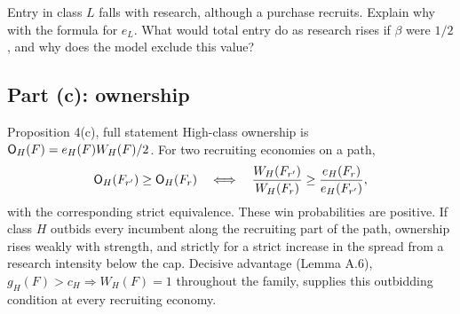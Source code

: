 \begin{checkyourself}\label{q:research-entry}
Entry in class \(L\) falls with research, although a purchase recruits. Explain why with the formula for \(e_L\). What
would total entry do as research rises if \(\beta\) were \(1/2\), and why does the model exclude this value?
\end{checkyourself}

\subsection{Part (c): ownership}

\begin{paperresult}{Proposition 4(c), full statement}
High-class ownership is \(\mathsf{O}_H(F)=e_H(F)W_H(F)/2\). For two recruiting economies on a path,
\[
\mathsf{O}_H(F_{r'})\ge\mathsf{O}_H(F_r)\quad\Longleftrightarrow\quad\frac{W_H(F_{r'})}{W_H(F_r)}\ge\frac{e_H(F_r)}{e_H(F_{r'})},
\]
with the corresponding strict equivalence. These win probabilities are positive. If class \(H\) outbids every
incumbent along the recruiting part of the path, ownership rises weakly with strength, and strictly for a strict
increase in the spread from a research intensity below the cap. Decisive advantage (Lemma A.6),
\(g_H(F)>c_H\Rightarrow W_H(F)=1\) throughout the family, supplies this outbidding condition at every recruiting
economy.
\end{paperresult}

